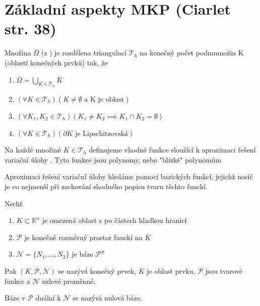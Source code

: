 \documentclass[../main.tex]{subfiles}
\begin{document}
\section{Základní aspekty MKP (Ciarlet str. 38)}
\begin{theorem}[MKP1]
    Množina $\bar{\Omega}$ (z ) je rozdělena triangulací $\mathcal{T}_h$ na konečný počet podmmnožin K (oblastí konečných prvků) tak, že 
    \begin{enumerate}
        \item $\bar{\Omega} = \bigcup_{K\in\mathcal{T}_h} \bar{K}$
        \item $(\forall K  \in \mathcal{T}_h)(K\neq\emptyset \text{ a K je oblast})$
        \item $(\forall K_1, K_2 \in \mathcal{T}_h)(K_1 \neq K_2 \implies K_1 \cap K_2 = \emptyset)$
        \item $(\forall K \in \mathcal{T}_h) (\partial K \text{ je Lipschitzovská} )$
    \end{enumerate}
\end{theorem}

\begin{theorem}[MKP2]
    Na každé množině $K\in\mathcal{T}_h$ definujeme vhodné funkce sloužící k aproximaci řešení variační úlohy  . Tyto funkce jsou polynomy, nebo "blízké" polynomům
\end{theorem}


\begin{theorem}[MKP3]
    Aproximaci řešení variační úlohy  hledáme pomocí bazických funkcí, jejichž nosič je co nejmenší při zachování shodného popisu tvaru těchto funckí. 
\end{theorem}


\begin{definition}
    Nechť \begin{enumerate}
        \item $K \subset \mathbb{R}^n$ je omezená oblast s po částech hladkou hranicí
        \item $\mathcal{P}$ je konečně rozměrný prostor funckí na $\bar{K}$
        \item $\mathcal{N} = \{N_1, ..., N_2\}$ je báze $\mathcal{P}^{\#}$
    \end{enumerate}
    Pak $(K, \mathcal{P}, \mathcal{N})$ se nazývá konečný prvek, $K$ je oblast prvku, $\mathcal{P}$ jsou tvarové funkce a $\mathcal{N}$ uzlové proměnné.

    Báze v $\mathcal{P}$ duální k $\mathcal{N}$ se nazývá nulová báze.
\end{definition}
\end{document}
